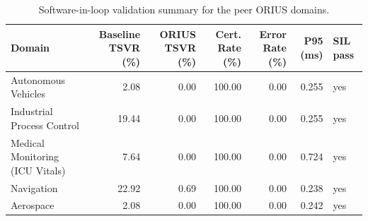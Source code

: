 \begin{table}[htbp]
\centering
\caption{Software-in-loop validation summary for the peer ORIUS domains.}
\label{tab:domain-sil-summary}
\begin{tabular}{lrrrrrl}
\toprule
Domain & Baseline TSVR (\%) & ORIUS TSVR (\%) & Cert. Rate (\%) & Error Rate (\%) & P95 (ms) & SIL pass \\
\midrule
Autonomous Vehicles & 2.08 & 0.00 & 100.00 & 0.00 & 0.255 & yes \\
Industrial Process Control & 19.44 & 0.00 & 100.00 & 0.00 & 0.255 & yes \\
Medical Monitoring (ICU Vitals) & 7.64 & 0.00 & 100.00 & 0.00 & 0.724 & yes \\
Navigation & 22.92 & 0.69 & 100.00 & 0.00 & 0.238 & yes \\
Aerospace & 2.08 & 0.00 & 100.00 & 0.00 & 0.242 & yes \\
\bottomrule
\end{tabular}
\end{table}
